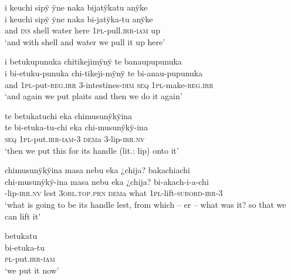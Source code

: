 \ea%
\begingl
\glpreamble i keuchi sipÿ ÿne naka bijatÿkatu anÿke\\
\gla i keuchi sipÿ ÿne naka bi-jatÿka-tu anÿke\\
\glb and \textsc{ins} shell water here 1\textsc{pl}-pull.\textsc{irr}-\textsc{iam} up\\
\glft ‘and with shell and water we pull it up here’
\endgl
\xe

\ea%
\begingl 
\glpreamble i betukupunuka chitikejimÿnÿ te banaupupunuka\\
\gla i bi-etuku-punuka chi-tikeji-mÿnÿ te bi-anau-pupunuka\\ 
\glb and 1\textsc{pl}-put-\textsc{reg.irr} 3-intestines-\textsc{dim} \textsc{seq} 1\textsc{pl}-make-\textsc{reg.irr}\\ 
\glft ‘and again we put plaits and then we do it again’\\ 
\endgl
\xe


\ea%
\begingl 
\glpreamble te betukatuchi eka chimusunÿkÿina\\
\gla te bi-etuka-tu-chi eka chi-musunÿkÿ-ina\\ 
\glb \textsc{seq} 1\textsc{pl}-put.\textsc{irr}-\textsc{iam}-3 \textsc{dem}a 3-lip-\textsc{irr.nv}\\ 
\glft ‘then we put this for its handle (lit.: lip) onto it’\\ 
\endgl
\xe

\ea%
\begingl 
\glpreamble chimusunÿkÿina masa nebu eka ¿chija? bakachiachi\\
\gla chi-musunÿkÿ-ina masa nebu eka ¿chija? bi-akach-i-a-chi\\ 
-lip-\textsc{irr.nv} lest 3\textsc{obl.top.prn} \textsc{dem}a what 1\textsc{pl}-lift-\textsc{subord}-\textsc{irr}-3\\ 
\glft ‘what is going to be its handle lest, from which – er – what was it? so that we can lift it’\\ 
\endgl
\xe


\ea%
\begingl 
\glpreamble betukatu\\
\gla bi-etuka-tu\\ 
\textsc{pl}-put.\textsc{irr}-\textsc{iam}\\ 
\glft ‘we put it now’\\ 
\endgl
\xe

